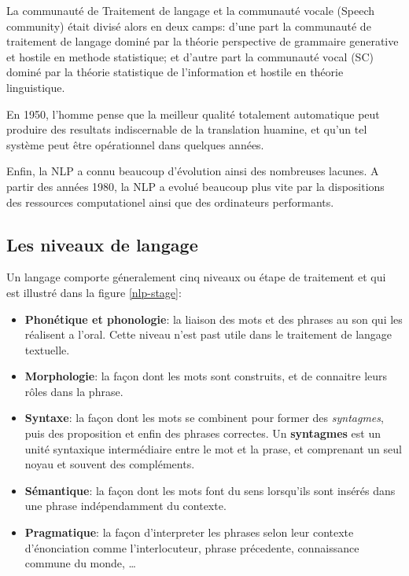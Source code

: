 La communauté de Traitement de langage et la communauté vocale (Speech community) était divisé alors en deux camps: d'une part la communauté de traitement de langage dominé par la théorie perspective de grammaire generative et hostile en methode statistique; et d'autre part la communauté vocal (SC) dominé par la théorie statistique de l'information et hostile en théorie linguistique.

En 1950, l'homme pense que la meilleur qualité totalement automatique peut produire des resultats indiscernable de la translation huamine, et qu'un tel système peut être opérationnel dans quelques années.

Enfin, la NLP a connu beaucoup d'évolution ainsi des nombreuses lacunes. A partir des années 1980, la NLP a evolué beaucoup plus vite par la dispositions des ressources computationel ainsi que des ordinateurs performants.

\subsection{Les niveaux de langage}
Un langage comporte géneralement cinq niveaux ou étape de traitement \citep*{automatic-nlp, handbook-nlp} et qui est illustré dans la figure \ref{nlp-stage}:
\begin{itemize}
    \item \textbf{Phonétique et phonologie}: la liaison des mots et des phrases au son qui les réalisent a l'oral. Cette niveau n'est past utile dans le traitement de langage textuelle.
    \item \textbf{Morphologie}: la façon dont les mots sont construits, et de connaitre leurs rôles dans la phrase.
    \item \textbf{Syntaxe}: la façon dont les mots se combinent pour former des \textit{syntagmes}, puis des proposition et enfin des phrases correctes. Un \textbf{syntagmes} est un unité syntaxique intermédiaire entre le mot et la prase, et comprenant un seul noyau et souvent des compléments.
    \item \textbf{Sémantique}: la façon dont les mots font du sens lorsqu'ils sont insérés dans une phrase indépendamment du contexte.
    \item \textbf{Pragmatique}: la façon d'interpreter les phrases selon leur contexte d'énonciation comme l'interlocuteur, phrase précedente, connaissance commune du monde, \dots
\end{itemize}

